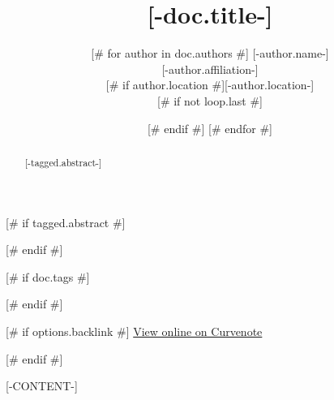 \documentclass{article}
\title{[-doc.title-]}
\date{\displaydate{articleDate}}
[# else #]
\date{}
[# endif #]
\author{[# for author in doc.authors #]
[-author.name-]\\
[# if author.affiliation #][-author.affiliation-]\\[# endif #]
[# if author.location #][-author.location-]\\[# endif #]
[# if not loop.last #]
\and
[# endif #]
[# endfor #]
}
\begin{document}
\maketitle

[# if tagged.abstract #]
\begin{abstract}
[-tagged.abstract-]
\end{abstract}

[# endif #]


[# if doc.tags #]

[# endif #]

[# if options.backlink #]
\footnotesize
\href{[-doc.oxalink-]}{View online on Curvenote}

\normalsize
[# endif #]

[-CONTENT-]




\end{document}
